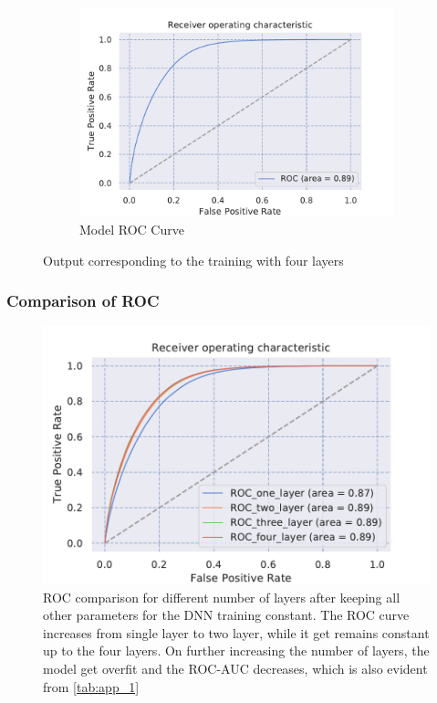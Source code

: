 \begin{figure}[H]
\begin{subfigure}[b]{0.3\textwidth}
         \centering
         \includegraphics[width=\textwidth]{figure_3/four_layer_only_ROC.pdf}
         \caption{Model ROC Curve}
         \label{fig:five over x}
     \end{subfigure}
        \caption{Output corresponding to the training with four layers}
        \label{fig:three graphs}
\end{figure}





\subsubsection{Comparison of ROC}
\begin{figure}[h]
    \centering
    \includegraphics{figure_3/comaprision_ROC_with_layer_only_ROC.pdf}
    \caption{ROC comparison for different number of layers after keeping all other parameters for the DNN training constant. The ROC curve increases from single layer to two layer, while it get remains constant up to the four layers. On further increasing the number of layers, the model get overfit and the ROC-AUC decreases, which is also evident from \autoref{tab:app_1}}
    \label{fig:my_label}
\end{figure}



\setcounter{equation}{0}
\setcounter{table}{0}
\setcounter{figure}{0}


    



